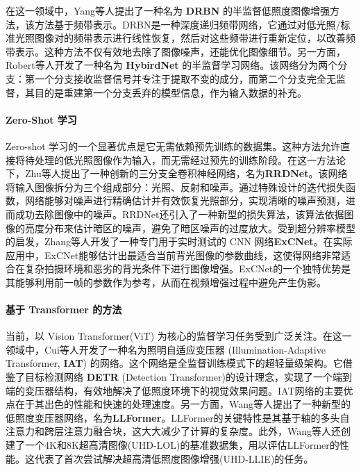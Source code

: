 \documentclass[a4paper]{ctexart}
\begin{document}
	在这一领域中，Yang等人\cite{qiao2021deep}提出了一种名为 \textbf{DRBN} 的半监督低照度图像增强方法，该方法基于频带表示。DRBN是一种深度递归频带网络，它通过对低光照/标准光照图像对的频带表示进行线性恢复，然后对这些频带进行重新定位，以改善频带表示。这种方法不仅有效地去除了图像噪声，还能优化图像细节。另一方面，Robert等人开发了一种名为 \textbf{HybirdNet} 的半监督学习网络\cite{robert2018hybridnet}。该网络分为两个分支：第一个分支接收监督信号并专注于提取不变的成分，而第二个分支完全无监督，其目的是重建第一个分支丢弃的模型信息，作为输入数据的补充。
	
	\paragraph{Zero-Shot 学习}
	
	Zero-shot 学习的一个显著优点是它无需依赖预先训练的数据集。这种方法允许直接将待处理的低光照图像作为输入，而无需经过预先的训练阶段。在这一方法论下，Zhu等人\cite{zhu2020zero}提出了一种创新的三分支全卷积神经网络，名为\textbf{RRDNet}。该网络将输入图像拆分为三个组成部分：光照、反射和噪声。通过特殊设计的迭代损失函数，网络能够对噪声进行精确估计并有效恢复光照部分，实现清晰的噪声预测，进而成功去除图像中的噪声。RRDNet还引入了一种新型的损失算法，该算法依据图像的亮度分布来估计暗区的噪声，避免了暗区噪声的过度放大。受到超分辨率模型的启发，Zhang等人\cite{zhang2019zero}开发了一种专门用于实时测试的 CNN 网络\textbf{ExCNet}。在实际应用中，ExCNet能够估计出最适合当前背光图像的参数曲线，这使得网络非常适合在复杂拍摄环境和恶劣的背光条件下进行图像增强。ExCNet的一个独特优势是其能够利用前一帧的参数作为参考，从而在视频增强过程中避免产生伪影。
	
	\paragraph{基于 Transformer 的方法}
	
	当前，以 Vision Transformer(ViT) 为核心的监督学习任务受到广泛关注。在这一领域中，Cui等人\cite{cui2022illumination}开发了一种名为照明自适应变压器 (Illumination-Adaptive Transformer, \textbf{IAT}) 的网络。这个网络是全监督训练模式下的超轻量级架构。它借鉴了目标检测网络 \textbf{DETR} (Detection Transformer)的设计理念\cite{carion2020end}，实现了一个端到端的变压器结构，有效地解决了低照度环境下的视觉效果问题。IAT网络的主要优点在于其出色的性能和快速的处理速度。另一方面，Wang等人\cite{wang2023ultra}提出了一种新型的低照度变压器网络，名为\textbf{LLFormer}。LLFormer的关键特性是其基于轴的多头自注意力和跨层注意力融合块，这大大减少了计算的复杂度。此外，Wang等人还创建了一个4K和8K超高清图像(UHD-LOL)的基准数据集，用以评估LLFormer的性能。这代表了首次尝试解决超高清低照度图像增强(UHD-LLIE)的任务。
	
\end{document}
